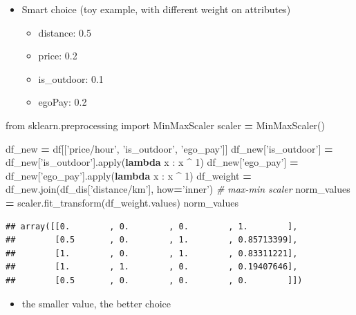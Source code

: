 \documentclass[]{book}
\newenvironment{Shaded}{\begin{snugshade}}{\end{snugshade}}
\newcommand{\BuiltInTok}[1]{#1}
\newcommand{\CommentTok}[1]{\textcolor[rgb]{0.56,0.35,0.01}{\textit{#1}}}
\newcommand{\DecValTok}[1]{\textcolor[rgb]{0.00,0.00,0.81}{#1}}
\newcommand{\ImportTok}[1]{#1}
\newcommand{\KeywordTok}[1]{\textcolor[rgb]{0.13,0.29,0.53}{\textbf{#1}}}
\newcommand{\NormalTok}[1]{#1}
\newcommand{\OperatorTok}[1]{\textcolor[rgb]{0.81,0.36,0.00}{\textbf{#1}}}
\newcommand{\StringTok}[1]{\textcolor[rgb]{0.31,0.60,0.02}{#1}}
\providecommand{\tightlist}{%
  \setlength{\itemsep}{0pt}\setlength{\parskip}{0pt}}
\begin{document}
\begin{itemize}
\tightlist
\item
  Smart choice (toy example, with different weight on attributes)

  \begin{itemize}
  \tightlist
  \item
    distance: 0.5
  \item
    price: 0.2
  \item
    is\_outdoor: 0.1
  \item
    egoPay: 0.2
  \end{itemize}
\end{itemize}

\begin{Shaded}
\begin{Highlighting}[]
\ImportTok{from}\NormalTok{ sklearn.preprocessing }\ImportTok{import}\NormalTok{ MinMaxScaler}
\NormalTok{scaler }\OperatorTok{=}\NormalTok{ MinMaxScaler()}

\NormalTok{df_new }\OperatorTok{=}\NormalTok{ df[[}\StringTok{'price/hour'}\NormalTok{, }\StringTok{'is_outdoor'}\NormalTok{, }\StringTok{'ego_pay'}\NormalTok{]]}
\NormalTok{df_new[}\StringTok{'is_outdoor'}\NormalTok{] }\OperatorTok{=}\NormalTok{ df_new[}\StringTok{'is_outdoor'}\NormalTok{].}\BuiltInTok{apply}\NormalTok{(}\KeywordTok{lambda}\NormalTok{ x : x }\OperatorTok{^} \DecValTok{1}\NormalTok{)}
\NormalTok{df_new[}\StringTok{'ego_pay'}\NormalTok{] }\OperatorTok{=}\NormalTok{ df_new[}\StringTok{'ego_pay'}\NormalTok{].}\BuiltInTok{apply}\NormalTok{(}\KeywordTok{lambda}\NormalTok{ x : x }\OperatorTok{^} \DecValTok{1}\NormalTok{)}
\NormalTok{df_weight }\OperatorTok{=}\NormalTok{ df_new.join(df_dis[}\StringTok{'distance/km'}\NormalTok{], how}\OperatorTok{=}\StringTok{'inner'}\NormalTok{)}
\CommentTok{# max-min scaler}
\NormalTok{norm_values }\OperatorTok{=}\NormalTok{ scaler.fit_transform(df_weight.values)}
\NormalTok{norm_values}
\end{Highlighting}
\end{Shaded}

\begin{verbatim}
## array([[0.        , 0.        , 0.        , 1.        ],
##        [0.5       , 0.        , 1.        , 0.85713399],
##        [1.        , 0.        , 1.        , 0.83311221],
##        [1.        , 1.        , 0.        , 0.19407646],
##        [0.5       , 0.        , 0.        , 0.        ]])
\end{verbatim}

\begin{itemize}
\tightlist
\item
  the smaller value, the better choice
\end{itemize}
\end{document}
